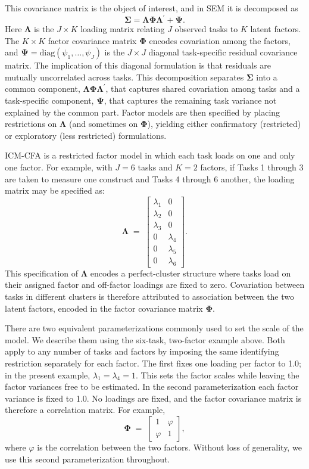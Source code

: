 \documentclass[
  american,
  man,floatsintext]{apa7}
\begin{document}
This covariance matrix is the object of interest, and in SEM it is decomposed as
\[
\pmb{\Sigma} =\pmb{\Lambda}\pmb{\Phi}\pmb{\Lambda}^{\prime} + \pmb{\Psi}.
\]
Here \(\pmb{\Lambda}\) is the \(J \times K\) loading matrix relating \(J\) observed tasks to \(K\) latent factors. The \(K \times K\) factor covariance matrix \(\pmb{\Phi}\) encodes covariation among the factors, and \(\pmb{\Psi}=\mathrm{diag}(\psi_{1},\ldots,\psi_{J})\) is the \(J\times J\) diagonal task-specific residual covariance matrix. The implication of this diagonal formulation is that residuals are mutually uncorrelated across tasks. This decomposition separates \(\pmb{\Sigma}\) into a common component, \(\pmb{\Lambda}\pmb{\Phi}\pmb{\Lambda}^{\prime}\), that captures shared covariation among tasks and a task-specific component, \(\pmb{\Psi}\), that captures the remaining task variance not explained by the common part. Factor models are then specified by placing restrictions on \(\pmb{\Lambda}\) (and sometimes on \(\pmb{\Phi}\)), yielding either confirmatory (restricted) or exploratory (less restricted) formulations.

ICM-CFA is a restricted factor model in which each task loads on one and only one factor. For example, with \(J=6\) tasks and \(K=2\) factors, if Tasks 1 through 3 are taken to measure one construct and Tasks 4 through 6 another, the loading matrix may be specified as:
\[
\pmb{\Lambda} \;=\;
\begin{bmatrix}
  \lambda_{1} & 0 \\
  \lambda_{2} & 0 \\
  \lambda_{3} & 0 \\
  0 & \lambda_{4} \\
  0 & \lambda_{5} \\
  0 & \lambda_{6}
\end{bmatrix}.
\]
This specification of \(\pmb{\Lambda}\) encodes a perfect-cluster structure where tasks load on their assigned factor and off-factor loadings are fixed to zero. Covariation between tasks in different clusters is therefore attributed to association between the two latent factors, encoded in the factor covariance matrix \(\pmb{\Phi}\).

There are two equivalent parameterizations commonly used to set the scale of the model. We describe them using the six-task, two-factor example above. Both apply to any number of tasks and factors by imposing the same identifying restriction separately for each factor. The first fixes one loading per factor to 1.0; in the present example, \(\lambda_1=\lambda_4=1\). This sets the factor scales while leaving the factor variances free to be estimated. In the second parameterization each factor variance is fixed to 1.0. No loadings are fixed, and the factor covariance matrix is therefore a correlation matrix. For example,
\[
\pmb{\Phi} \;=\;
\begin{bmatrix}
  1 &  \varphi \\
  \varphi & 1
\end{bmatrix},
\]
where \(\varphi\) is the correlation between the two factors. Without loss of generality, we use this second parameterization throughout.
\end{document}
